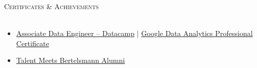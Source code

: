 \documentclass[a4paper]{article}
\newcommand{\lineunder} {
    \vspace*{-8pt} \\
    \hspace*{-18pt} \hrulefill \\
}
\newcommand{\header} [1] {
    {\hspace*{-18pt}\vspace*{6pt} \textsc{#1}}
    \vspace*{-6pt} \lineunder
}
\begin{document}
\header{Certificates \& Achievements}
\vspace{-2mm}
\begin{itemize} \itemsep -2pt
    \item \href{https://www.datacamp.com/certificate/DEA0019349892331}{Associate Data Engineer -- Datacamp} \quad $\mid$ \quad \href{https://coursera.org/share/77f44f712619905a07ce551f806c10e4}{Google Data Analytics Professional Certificate}
    \item \href{https://createyourowncareer.de/studenten/talent-meets-bertelsmann}{Talent Meets Bertelsmann Alumni}
\end{itemize}
\end{document}
